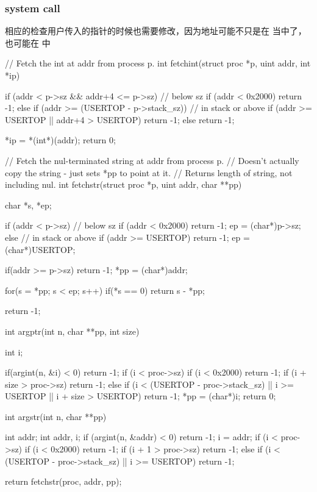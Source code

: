 \subsubsection{system call}

相应的检查用户传入的指针的时候也需要修改，因为地址可能不只是在 \cw{[0, sz)} 当中了，也可能在 \cw{[USERTOP-stack_sz, USERTOP)} 中

\begin{ccode}
    // Fetch the int at addr from process p.
    int
    fetchint(struct proc *p, uint addr, int *ip)
    {
        if (addr < p->sz && addr+4 <= p->sz) { // below sz
            if (addr < 0x2000) return -1;
        } else if (addr >= (USERTOP - p->stack_sz)) { // in stack or above
            if (addr >= USERTOP || addr+4 > USERTOP) return -1;
        } else return -1;

        *ip = *(int*)(addr);
        return 0;
    }

    // Fetch the nul-terminated string at addr from process p.
    // Doesn't actually copy the string - just sets *pp to point at it.
    // Returns length of string, not including nul.
    int
    fetchstr(struct proc *p, uint addr, char **pp)
    {
        char *s, *ep;

        if (addr < p->sz) { // below sz
            if (addr < 0x2000) return -1;
            ep = (char*)p->sz;
        } else { // in stack or above
            if (addr >= USERTOP) return -1;
            ep = (char*)USERTOP;
        }

        if(addr >= p->sz)
            return -1;
        *pp = (char*)addr;
        
        for(s = *pp; s < ep; s++)
            if(*s == 0)
                return s - *pp;
        
        return -1;
    }
    int
    argptr(int n, char **pp, int size)
    {
        int i;
        
        if(argint(n, &i) < 0)
            return -1;
        if (i < proc->sz) {
            if (i < 0x2000) return -1;
            if (i + size > proc->sz) return -1;
        } else {
            if (i < (USERTOP - proc->stack_sz) || i >= USERTOP 
            || i + size > USERTOP) {
                return -1;
            }
        }
        *pp = (char*)i;
        return 0;
    }
    int argstr(int n, char **pp)
    {
        int addr;
        int addr, i;
        if (argint(n, &addr) < 0)
            return -1;
        i = addr;
        if (i < proc->sz)
        {
            if (i < 0x2000)
            return -1;
            if (i + 1 > proc->sz)
            return -1;
        }
        else
        {
            if (i < (USERTOP - proc->stack_sz) || i >= USERTOP) {
            return -1;
            }
        }

        return fetchstr(proc, addr, pp);
    }
\end{ccode}

